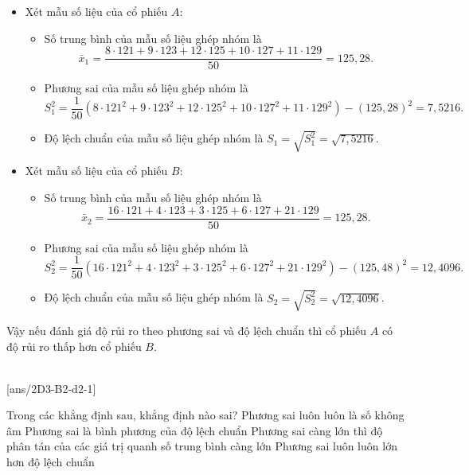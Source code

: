 \begin{vd}
{\begin{center}
\begin{tabular}{|c|c|c|c|c|c|}
				\hline
			\end{tabular}
		\end{center}
		\begin{itemize}
			\item Xét mẫu số liệu của cổ phiếu $A$:
			      \begin{itemize}
				      \item Số trung bình của mẫu số liệu ghép nhóm là
				            $$
					            \bar{x}_1=\dfrac{8 \cdot 121+9\cdot 123+12 \cdot 125+10\cdot 127+11\cdot 129}{50}=125,28.
				            $$
				      \item Phương sai của mẫu số liệu ghép nhóm là
				            $$
					            S_1^2=\dfrac{1}{50}\left(8 \cdot 121^2+9 \cdot 123^2+12 \cdot 125^2+10 \cdot 127^2+11 \cdot 129^2\right)-(125,28)^2=7,5216.
				            $$
				      \item Độ lệch chuẩn của mẫu số liệu ghép nhóm là $S_1=\sqrt{S_1^2}=\sqrt{7,5216}$.
			      \end{itemize}
			\item Xét mẫu số liệu của cổ phiếu $B$:
			      \begin{itemize}
				      \item Số trung bình của mẫu số liệu ghép nhóm là
				            $$
					            \bar{x}_2=\dfrac{16\cdot 121+4\cdot 123+3\cdot 125+6\cdot 127+21\cdot 129}{50}=125,28.
				            $$
				      \item Phương sai của mẫu số liệu ghép nhóm là
				            $$
					            S_2^2=\dfrac{1}{50}\left(16\cdot 121^2+4\cdot 123^2+3 \cdot 125^2+6 \cdot 127^2+21\cdot 129^2\right)-(125,48)^2=12,4096.$$
				      \item Độ lệch chuẩn của mẫu số liệu ghép nhóm là $S_2=\sqrt{S_2^2}=\sqrt{12,4096}$.
			      \end{itemize}
		\end{itemize}
		Vậy nếu đánh giá độ rủi ro theo phương sai và độ lệch chuẩn thì cổ phiếu $A$ có độ rủi ro thấp hơn cổ phiếu $B$.
	}
\end{vd}
 \\
\setcounter{ex}{0}
[ans/2D3-B2-d2-1]
\begin{ex}
	Trong các khẳng định sau, khẳng định nào sai?
	\choice
	{Phương sai luôn luôn là số không âm}
	{Phương sai là bình phương của độ lệch chuẩn}
	{Phương sai càng lớn thì độ phân tán của các giá trị quanh số trung bình càng lớn}
	{\True Phương sai luôn luôn lớn hơn độ lệch chuẩn}
\end{ex}
